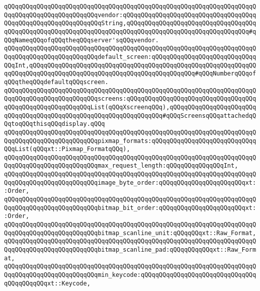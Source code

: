\verb|qQQqqQQqqQQqqQQqqQQqqQQqqQQqqQQqqQQqqQQqqQQqqQQqqQQqqQQqqQQqqQQqqQQqqQQqqQQqqQQqqQQqqQQqqQQqqQQqvendor:qQQqqQQqqQQqqQQqqQQqqQQqqQQqqQQqqQQqqQQqqQQqqQQqqQQqqQQqqQQqqQQqString,qQQqqQQqqQQqqQQqqQQqqQQqqQQqqQQqqQQqqQQqqQQqqQQqqQQqqQQqqQQqqQQqqQQqqQQqqQQqqQQqqQQqqQQqqQQqqQQqqQQqqQQq#qQQqNameqQQqofqQQqtheqQQqserver'sqQQqvendor.|\newline
\newline
\verb|qQQqqQQqqQQqqQQqqQQqqQQqqQQqqQQqqQQqqQQqqQQqqQQqqQQqqQQqqQQqqQQqqQQqqQQqqQQqqQQqqQQqqQQqqQQqqQQqdefault_screen:qQQqqQQqqQQqqQQqqQQqqQQqqQQqqQQqInt,qQQqqQQqqQQqqQQqqQQqqQQqqQQqqQQqqQQqqQQqqQQqqQQqqQQqqQQqqQQqqQQqqQQqqQQqqQQqqQQqqQQqqQQqqQQqqQQqqQQqqQQqqQQqqQQqqQQq#qQQqNumberqQQqofqQQqtheqQQqdefaultqQQqscreen.|\newline
\verb|qQQqqQQqqQQqqQQqqQQqqQQqqQQqqQQqqQQqqQQqqQQqqQQqqQQqqQQqqQQqqQQqqQQqqQQqqQQqqQQqqQQqqQQqqQQqqQQqscreens:qQQqqQQqqQQqqQQqqQQqqQQqqQQqqQQqqQQqqQQqqQQqqQQqqQQqqQQqqQQqList(qQQqXscreenqQQq),qQQqqQQqqQQqqQQqqQQqqQQqqQQqqQQqqQQqqQQqqQQqqQQqqQQqqQQqqQQqqQQqqQQq#qQQqScreensqQQqattachedqQQqtoqQQqthisqQQqdisplay.qQQq|\newline
\newline
\verb|qQQqqQQqqQQqqQQqqQQqqQQqqQQqqQQqqQQqqQQqqQQqqQQqqQQqqQQqqQQqqQQqqQQqqQQqqQQqqQQqqQQqqQQqqQQqqQQqpixmap_formats:qQQqqQQqqQQqqQQqqQQqqQQqqQQqqQQqList(qQQqxt::Pixmap_FormatqQQq),|\newline
\verb|qQQqqQQqqQQqqQQqqQQqqQQqqQQqqQQqqQQqqQQqqQQqqQQqqQQqqQQqqQQqqQQqqQQqqQQqqQQqqQQqqQQqqQQqqQQqqQQqmax_request_length:qQQqqQQqqQQqqQQqInt,|\newline
\newline
\verb|qQQqqQQqqQQqqQQqqQQqqQQqqQQqqQQqqQQqqQQqqQQqqQQqqQQqqQQqqQQqqQQqqQQqqQQqqQQqqQQqqQQqqQQqqQQqqQQqimage_byte_order:qQQqqQQqqQQqqQQqqQQqqQQqxt::Order,|\newline
\verb|qQQqqQQqqQQqqQQqqQQqqQQqqQQqqQQqqQQqqQQqqQQqqQQqqQQqqQQqqQQqqQQqqQQqqQQqqQQqqQQqqQQqqQQqqQQqqQQqbitmap_bit_order:qQQqqQQqqQQqqQQqqQQqqQQqxt::Order,|\newline
\newline
\verb|qQQqqQQqqQQqqQQqqQQqqQQqqQQqqQQqqQQqqQQqqQQqqQQqqQQqqQQqqQQqqQQqqQQqqQQqqQQqqQQqqQQqqQQqqQQqqQQqbitmap_scanline_unit:qQQqqQQqxt::Raw_Format,|\newline
\verb|qQQqqQQqqQQqqQQqqQQqqQQqqQQqqQQqqQQqqQQqqQQqqQQqqQQqqQQqqQQqqQQqqQQqqQQqqQQqqQQqqQQqqQQqqQQqqQQqbitmap_scanline_pad:qQQqqQQqqQQqxt::Raw_Format,|\newline
\newline
\verb|qQQqqQQqqQQqqQQqqQQqqQQqqQQqqQQqqQQqqQQqqQQqqQQqqQQqqQQqqQQqqQQqqQQqqQQqqQQqqQQqqQQqqQQqqQQqqQQqmin_keycode:qQQqqQQqqQQqqQQqqQQqqQQqqQQqqQQqqQQqqQQqqQQqxt::Keycode,|\newline
